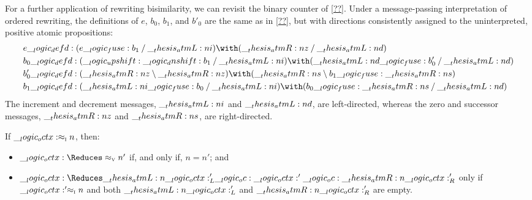 For a further application of rewriting bisimilarity, we can revisit the binary counter of \cref{??}.
Under a message-passing interpretation of ordered rewriting, the definitions of $e$, $b_0$, $b_1$, and $b'_0$ are the same as in \cref{??}, but with directions consistently assigned to the uninterpreted, positive atomic propositions:
\begin{equation*}
  \begin{lgathered}
    e \defd (e \fuse b_1 \pmir \atmL{i}) \with (\atmR{z} \pmir \atmL{d}) \\
    b_0 \defd (\up \dn b_1 \pmir \atmL{i}) \with (\atmL{d} \fuse b'_0 \pmir \atmL{d}) \\
    b'_0 \defd (\atmR{z} \limp \atmR{z}) \with (\atmR{s} \limp b_1 \fuse \atmR{s}) \\
    b_1 \defd (\atmL{i} \fuse b_0 \pmir \atmL{i}) \with (b_0 \fuse \atmR{s} \pmir \atmL{d})
  \end{lgathered}
\end{equation*}
The increment and decrement messages, $\__thesis_atmL:n {i}$ and $\__thesis_atmL:n {d}$, are left-directed, whereas the zero and successor messages, $\__thesis_atmR:n {z}$ and $\__thesis_atmR:n {s}$, are right-directed.



\begin{theorem}\label{thm:msg-inc-big-adequacy}
  If $\__logic_octx: \approx\sb{\text{\normalfont\scshape i}} n$, then:
  \begin{itemize}[nosep]
  \item $\octx \Reduces\aval{}{n'}$ if, and only if, $n = n'$; and
  \item $\octx \Reduces \atmL{\octx}'_L \oc \octx' \oc \atmR{\octx}'_R$ only if $\__logic_octx:' \approx\sb{\text{\normalfont\scshape i}} n$ and both $\__thesis_atmL:n {\__logic_octx:}'_L$ and $\__thesis_atmR:n {\__logic_octx:}'_R$ are empty.
  \end{itemize}
\end{theorem}

